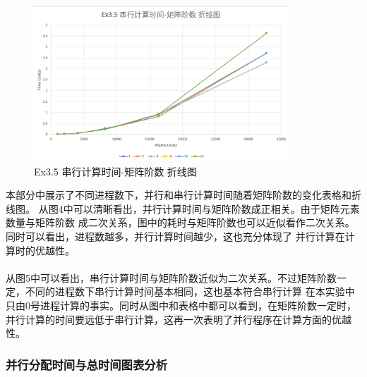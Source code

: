 \documentclass[UTF8]{article}
\begin{document}
    \begin{figure}[h]
        \centering
        \includegraphics[width=0.85\textwidth]{35sto.png}
        \caption{Ex3.5 串行计算时间-矩阵阶数 折线图}
    \end{figure}
    本部分中展示了不同进程数下，并行和串行计算时间随着矩阵阶数的变化表格和折线图。
    从图4中可以清晰看出，并行计算时间与矩阵阶数成正相关。由于矩阵元素数量与矩阵阶数
    成二次关系，图中的耗时与矩阵阶数也可以近似看作二次关系。同时可以看出，进程数越多，并行计算时间越少，这也充分体现了
    并行计算在计算时的优越性。\\\\

    从图5中可以看出，串行计算时间与矩阵阶数近似为二次关系。不过矩阵阶数一定，不同的进程数下串行计算时间基本相同，这也基本符合串行计算
    在本实验中只由0号进程计算的事实。同时从图中和表格中都可以看到，在矩阵阶数一定时，并行计算的时间要远低于串行计算，这再一次表明了并行程序在计算方面的优越性。


\clearpage
\subsubsection{并行分配时间与总时间图表分析}
\end{document}
